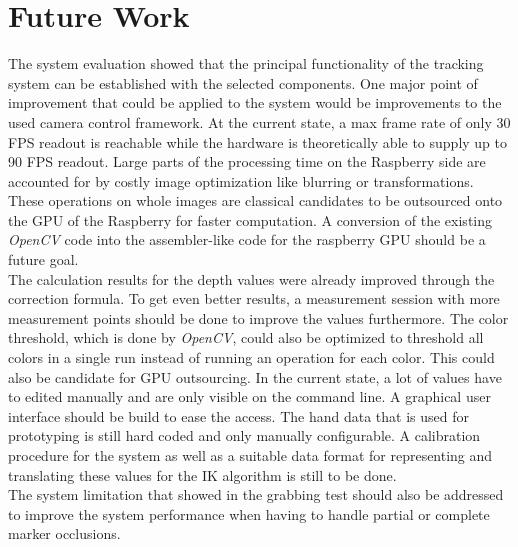 \chapter{Future Work}
The system evaluation showed that the principal functionality of the tracking system can be established with the selected components. One major point of improvement that could be applied to the system would be improvements to the used camera control framework. At the current state, a max frame rate of only 30 FPS readout is reachable while the hardware is theoretically able to supply up to 90 FPS readout. 
Large parts of the processing time on the Raspberry side are accounted for by costly image optimization like blurring or transformations. These operations on whole images are classical candidates to be outsourced onto the GPU of the Raspberry for faster computation. A conversion of the existing \textit{OpenCV} code into the assembler-like code for the raspberry GPU should be a future goal.\\
The calculation results for the depth values were already improved through the correction formula. To get even better results, a measurement session with more measurement points should be done to improve the values furthermore.
The color threshold, which is done by \textit{OpenCV}, could also be optimized to threshold all colors in a single run instead of running an operation for each color. This could also be candidate for GPU outsourcing.
In the current state, a lot of values have to edited manually and are only visible on the command line. A graphical user interface should be build to ease the access.
The hand data that is used for prototyping is still hard coded and only manually configurable. A calibration procedure for the system as well as a suitable data format for representing and translating these values for the IK algorithm is still to be done. 
\\The system limitation that showed in the grabbing test should also be addressed to improve the system performance when having to handle partial or complete marker occlusions.
